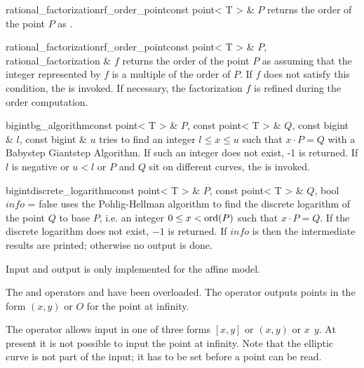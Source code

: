 \begin{fcode}{rational_factorization}{rf_order_point}{const point< T > & $P$}
  returns the order of the point $P$ as .
\end{fcode}

\begin{fcode}{rational_factorization}{rf_order_point}{const point< T > & $P$,
    rational_factorization & $f$}%
  returns the order of the point $P$ as  assuming that the integer
  represented by $f$ is a multiple of the order of $P$.  If $f$ does not satisfy this condition,
  the \LEH is invoked.  If necessary, the factorization $f$ is refined during the order
  computation.
\end{fcode}

\begin{fcode}{bigint}{bg_algorithm}{const point< T > & $P$, const point< T > & $Q$,
    const bigint & $l$, const bigint & $u$}%
  tries to find an integer $l \leq x \leq u$ such that $x \cdot P = Q$ with a Babystep Giantstep
  Algorithm.  If such an integer does not exist, -1 is returned.  If $l$ is negative or $u < l$
  or $P$ and $Q$ sit on different curves, the \LEH is invoked.
\end{fcode}

\begin{fcode}{bigint}{discrete_logarithm}{const point< T > & $P$, const point< T > & $Q$,
    bool $\mathit{info}$ = false}%
  uses the Pohlig-Hellman algorithm to find the discrete logarithm of the point $Q$ to base $P$,
  i.e. an integer $0\leq x < \operatorname{ord}(P)$ such that $x \cdot P = Q$.  If the discrete logarithm does
  not exist, $-1$ is returned.  If $\mathit{info}$ is \TRUE then the intermediate results are
  printed; otherwise no output is done.
\end{fcode}



\IO

Input and output is only implemented for the affine model.

The  and  operators \code{<<} and \code{>>} have been overloaded.
The operator \code{<<} outputs points in the form $(x,y)$ or $O$ for the point at infinity.

The operator \code{>>} allows input in one of three forms $[x,y] \text{ or } (x,y) \text{ or }
x~~y$.  At present it is not possible to input the point at infinity.  Note that the elliptic
curve is not part of the input; it has to be set before a point can be read.

